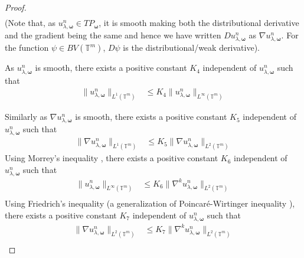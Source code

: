 \documentclass[multixcb]{amstext-l}
\theoremstyle{plain}
\theoremstyle{definition}
\theoremstyle{definition}
\theoremstyle{remark}
\numberwithin{equation}{chapter}
\begin{document}
\begin{proof}
\begin{equation}
\begin{aligned}
    \end{aligned}
\end{equation}
(Note that, as $u_{\lambda,\boldsymbol{\omega}}^n\in TP_{\boldsymbol{\omega}}$, it is smooth making both the distributional derivative and the gradient being the same and hence we have written $Du_{\lambda,\boldsymbol{\omega}}^n$ as $\nabla u_{\lambda,\boldsymbol{\omega}}^n$. For the function $\psi\in BV(\mathbb{T}^m)$, $D\psi$ is the distributional/weak derivative). 




As $u_{\lambda,\boldsymbol{\omega}}^n$ is smooth, there exists a positive constant $K_4$ independent of $u_{\lambda,\boldsymbol{\omega}}^n$ such that \begin{equation}\begin{aligned}\label{moon_1}
    \|u_{\lambda,\boldsymbol{\omega}}^n\|_{L^1(\mathbb{T}^m)} &\le K_4\|u_{\lambda,\boldsymbol{\omega}}^n\|_{L^{\infty}(\mathbb{T}^m)}
\end{aligned}
\end{equation} 

Similarly as $\nabla u_{\lambda,\boldsymbol{\omega}}^n$ is smooth, there exists a positive constant $K_5$ independent of $u_{\lambda,\boldsymbol{\omega}}^n$ such that \begin{equation}\begin{aligned}\label{moon_2}
   \|\nabla u_{\lambda,\boldsymbol{\omega}}^n\|_{L^1(\mathbb{T}^m)} &\le K_5\|\nabla u_{\lambda,\boldsymbol{\omega}}^n\|_{L^{2}(\mathbb{T}^m)}
\end{aligned}
\end{equation} 
Using Morrey's inequality \cite{evans1998partial}, there exists a positive constant $K_6$ independent of $u_{\lambda,\boldsymbol{\omega}}^n$ such that \begin{equation}\label{mars_1}\begin{aligned}
    \|u_{\lambda,\boldsymbol{\omega}}^n\|_{L^{\infty}(\mathbb{T}^m)} &\le K_6 \|\nabla^k u_{\lambda,\boldsymbol{\omega}}^n\|_{L^2(\mathbb{T}^m)}\\
\end{aligned}
\end{equation}
Using Friedrich's inequality \cite{zheng2005friedrichs} (a generalization of Poincar{\'e}-Wirtinger inequality \cite{evans1998partial}), there exists a positive constant $K_7$ independent of $u_{\lambda,\boldsymbol{\omega}}^n$ such that \begin{equation}\label{mars_2}\begin{aligned}
    \|\nabla u_{\lambda,\boldsymbol{\omega}}^n\|_{L^{2}(\mathbb{T}^m)} &\le K_7 \|\nabla^k u_{\lambda,\boldsymbol{\omega}}^n\|_{L^2(\mathbb{T}^m)}\\
\end{aligned}
\end{equation}


\end{proof}
\end{document}
